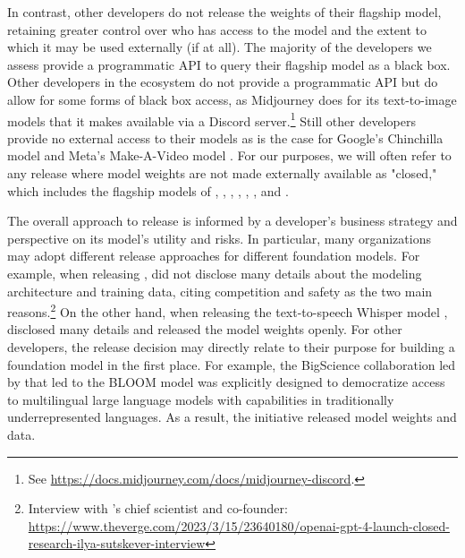 In contrast, other developers do not release the weights of their flagship model, retaining greater control over who has access to the model and the extent to which it may be used externally (if at all).
The majority of the developers we assess provide a programmatic API to query their flagship model as a black box.
Other developers in the ecosystem do not provide a programmatic API but do allow for some forms of black box access, as Midjourney does for its text-to-image models that it makes available via a Discord server.\footnote{See \url{https://docs.midjourney.com/docs/midjourney-discord}.}
Still other developers provide no external access to their models as is the case for Google's Chinchilla model \citep{hoffmann2022chinchilla} and Meta's Make-A-Video model \citep{singer2022makeavideo}.
For our purposes, we will often refer to any release where model weights are not made externally available as "closed," which includes the flagship models of \aitwentyone, \amazon, \anthropic, \cohere, \google, \inflection, and \openai.

The overall approach to release is informed by a developer's business strategy and perspective on its model's utility and risks. 
In particular, many organizations may adopt different release approaches for different foundation models.
For example, when releasing \gptfour, \openai did not disclose many details about the modeling architecture and training data, citing competition and safety as the two main reasons.\footnote{Interview with \openai's chief scientist and co-founder: \url{https://www.theverge.com/2023/3/15/23640180/openai-gpt-4-launch-closed-research-ilya-sutskever-interview}} 
On the other hand, when releasing the text-to-speech Whisper model \cite{radford2022whisper}, \openai disclosed many details and released the model weights openly.
For other developers, the release decision may directly relate to their purpose for building a foundation model in the first place.
For example, the BigScience collaboration led by \huggingface that led to the BLOOM model \citep{scao2022bloom} was explicitly designed to democratize access to multilingual large language models with capabilities in traditionally underrepresented languages.
As a result, the initiative released model weights and data. \clearpage

